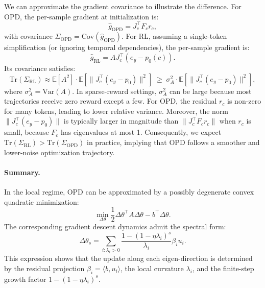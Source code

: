 \documentclass{llmxive}
\begin{document}
We can approximate the gradient covariance to illustrate the difference. For OPD, the per-sample gradient at initialization is:
\begin{equation}
\hat{g}_{\mathrm{OPD}} = J_c^{\top} F_c r_c,
\end{equation}
with covariance \(\Sigma_{\mathrm{OPD}} = \mathrm{Cov}(\hat{g}_{\mathrm{OPD}})\). For RL, assuming a single-token simplification (or ignoring temporal dependencies), the per-sample gradient is:
\begin{equation}
\hat{g}_{\mathrm{RL}} = A J_c^{\top} (e_y - p_0(c)).
\end{equation}
Its covariance satisfies:
\begin{equation}
\mathrm{Tr}(\Sigma_{\mathrm{RL}}) \approx \mathbb{E}[A^2] \cdot \mathbb{E}[\|J_c^{\top}(e_y-p_0)\|^2] \;\ge\; \sigma_A^2 \cdot \mathbb{E}[\|J_c^{\top}(e_y-p_0)\|^2],
\end{equation}
where \(\sigma_A^2 = \mathrm{Var}(A)\). In sparse-reward settings, \(\sigma_A^2\) can be large because most trajectories receive zero reward except a few. For OPD, the residual \(r_c\) is non-zero for many tokens, leading to lower relative variance. Moreover, the norm \(\|J_c^{\top}(e_y-p_0)\|\) is typically larger in magnitude than \(\|J_c^{\top}F_c r_c\|\) when \(r_c\) is small, because \(F_c\) has eigenvalues at most 1. Consequently, we expect \(\mathrm{Tr}(\Sigma_{\mathrm{RL}}) > \mathrm{Tr}(\Sigma_{\mathrm{OPD}})\) in practice, implying that OPD follows a smoother and lower-noise optimization trajectory.

\paragraph{Summary.}
In the local regime, OPD can be approximated by a possibly degenerate convex quadratic minimization:
\begin{equation}
\min_{\Delta\theta}
\frac{1}{2}\Delta\theta^{\top}A\Delta\theta
-
b^{\top}\Delta\theta .
\end{equation}
The corresponding gradient descent dynamics admit the spectral form:
\begin{equation}
\Delta\theta_s
=
\sum_{i:\lambda_i>0}
\frac{1-(1-\eta\lambda_i)^s}{\lambda_i}
\beta_i u_i .
\end{equation}
This expression shows that the update along each eigen-direction is determined by the residual projection \(\beta_i=\langle b,u_i\rangle\), the local curvature \(\lambda_i\), and the finite-step growth factor \(1-(1-\eta\lambda_i)^s\).
\end{document}
